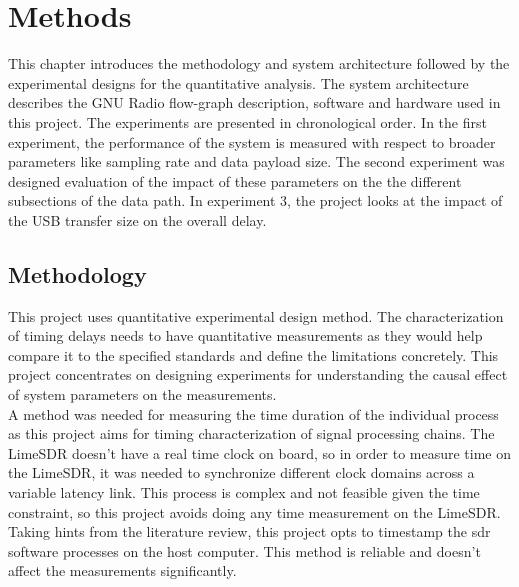 \chapter{Methods}
This chapter introduces the methodology and system architecture followed by the experimental designs for the quantitative analysis.
The system architecture describes the GNU Radio flow-graph description, software and hardware used in this project. The experiments are presented in chronological order. In the first experiment, the performance of the system is measured with respect to broader parameters like sampling rate and data payload size. The second experiment was designed evaluation of the impact of these parameters on the the different subsections of the data path. In experiment 3, the project looks at the impact of the USB transfer size on the overall delay.

\section{Methodology}
This project uses quantitative experimental design method.
The characterization of timing delays needs to have quantitative measurements as they would help compare it to the specified standards and define the limitations concretely.
This project concentrates on designing experiments for understanding the causal effect of system parameters on the measurements.\\

A method was needed for measuring the time duration of the individual process as this project aims for timing characterization of signal processing chains.
The LimeSDR doesn't have a real time clock on board, so in order to measure time on the LimeSDR, it was needed to synchronize different clock domains across a variable latency link.
This process is complex and not feasible given the time constraint, so this project avoids doing any time measurement on the LimeSDR.
Taking hints from the literature review, this project opts to timestamp the \ac{sdr} software processes on the host computer.
This method is reliable and doesn't affect the measurements significantly.\\

